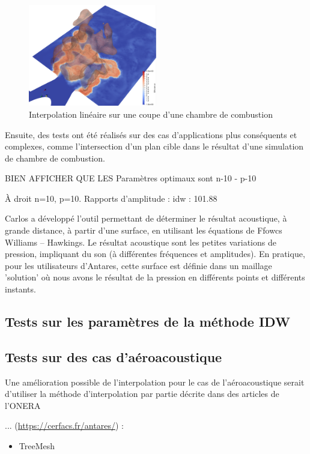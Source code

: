 \begin{figure}[H]
    \centering
    \includegraphics[width=0.50\textwidth]{images/cb-lineaire.png}
    \caption{Interpolation linéaire sur une coupe d'une chambre de combustion}
    \label{fig:cb-lineaire}
\end{figure}


Ensuite, des tests ont été réalisés sur des cas d'applications plus conséquents et complexes, comme l'intersection d'un plan cible dans le résultat d'une simulation de chambre de combustion. 




BIEN AFFICHER QUE LES Paramètres optimaux sont n-10 - p-10

À droit n=10, p=10. Rapports d'amplitude : idw : 101.88 %

Carlos a développé l'outil permettant de déterminer le résultat acoustique, à grande distance, à partir d'une surface, en utilisant les équations de Ffowcs Williams – Hawkings. Le résultat acoustique sont les petites variations de pression, impliquant du son (à différentes fréquences et amplitudes). En pratique, pour les utilisateurs d'Antares, cette surface est définie dans un maillage 'solution' où nous avons le résultat de la pression en différents points et différents instants.

\subsection{Tests sur les paramètres de la méthode IDW}

\subsection{Tests sur des cas d'aéroacoustique}

\cite{schoder2019}

Une amélioration possible de l'interpolation pour le cas de l'aéroacoustique serait d'utiliser la méthode d'interpolation par partie décrite dans des articles de l’ONERA\cite{cunha2011}\cite{cunha2016}




... (\url{https://cerfacs.fr/antares/}) : 


\begin{itemize}
    \item TreeMesh 
\end{itemize}


